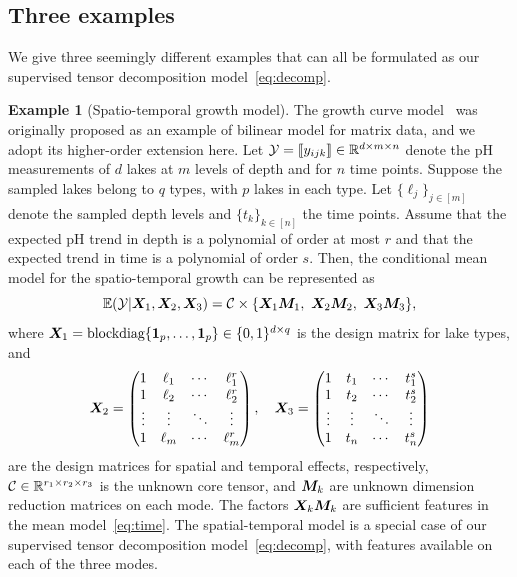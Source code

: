 \documentclass[12pt]{article}
\theoremstyle{definition}
\theoremstyle{definition}
\newtheorem{example}{Example}
\begin{document}
\subsection{Three examples}
We give three seemingly different examples that can all be formulated as our supervised tensor decomposition model~\eqref{eq:decomp}.
\begin{example}[Spatio-temporal growth model]
The growth curve model~\citep{gabriel1998generalised,srivastava2008models} was originally proposed as an example of bilinear model for matrix data, and we adopt its higher-order extension here. Let $\mathcal{Y}=\llbracket y_{ijk} \rrbracket\in\mathbb{R}^{d \times m\times n}$ denote the pH measurements of $d$ lakes at $m$ levels of depth and for $n$ time points. Suppose the sampled lakes belong to $q$ types, with $p$ lakes in each type. Let $\{\ell_j\}_{j\in[m]}$ denote the sampled depth levels and $\{t_k\}_{k\in[n]}$ the time points. Assume that the expected pH trend in depth is a polynomial of order at most $r$ and that the expected trend in time is a polynomial of order $s$. Then, the conditional mean model for the spatio-temporal growth can be represented as
\begin{equation}\label{eq:time}
\mathbb{E}(\tY|\mX_1,\mX_2,\mX_3)=\tC\times\{\mX_1\mM_1,\ \mX_2\mM_2,\ \mX_3\mM_3\},
\end{equation}
where $\bm X_1=\text{blockdiag}\{\mathbf{1}_p,\ldots,\mathbf{1}_p\}\in \{0,1\}^{d\times q}$ is the design matrix for lake types, and
\[
\bm X_2=
\begin{pmatrix}
1 & \ell_1&\cdots &\ell^{r}_1\\
1 & \ell_2&\cdots &\ell^{r}_2\\
\vdots &\vdots&\ddots&\vdots\\
1&\ell_{m}&\cdots&\ell^{r}_{m}
\end{pmatrix},\quad
\bm X_3=
\begin{pmatrix}
1 & t_1&\cdots &t^{s}_1\\
1 & t_2&\cdots &t^{s}_2\\
\vdots &\vdots&\ddots&\vdots\\
1&t_{n}&\cdots&t^{s}_{n}
\end{pmatrix}
\]
are the design matrices for spatial and temporal effects, respectively, $\mathcal{C}\in\mathbb{R}^{r_1\times r_2\times r_3}$ is the unknown core tensor, and $\bm M_k$ are unknown dimension reduction matrices on each mode. The factors $\bm X_k\bm M_k$ are sufficient features in the mean model~\eqref{eq:time}. The spatial-temporal model is a special case of our supervised tensor decomposition model~\eqref{eq:decomp}, with features available on each of the three modes.
\end{example}
\end{document}
